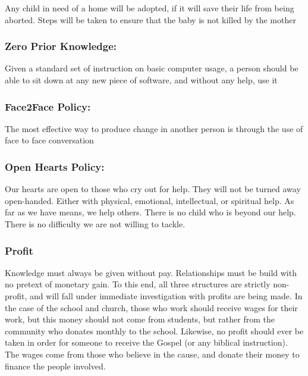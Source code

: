 \documentclass[CSHFoundation.tex]{subfiles}
\begin{document}
Any child in need of a home will be adopted, if it will save their life from being aborted. Steps will be taken to ensure that the baby is not killed by the mother



\subsubsection{Zero Prior Knowledge:}

Given a standard set of instruction on basic computer usage, a person should be able to sit down at any new piece of software, and without any help, use it



\subsubsection{Face2Face Policy:}

The most effective way to produce change in another person is through the use of face to face conversation



\subsubsection{Open Hearts Policy:}

Our hearts are open to those who cry out for help. They will not be turned away open-handed. Either with physical, emotional, intellectual, or spiritual help. As far as we have means, we help others. There is no child who is beyond our help. There is no difficulty we are not willing to tackle.


\subsubsection{Profit}
Knowledge must always be given without pay. Relationships must be build with no pretext of monetary gain. To this end, all three structures are strictly non-profit, and will fall under immediate investigation with profits are being made. In the case of the school and church, those who work should receive wages for their work, but this money should not come from students, but rather from the community who donates monthly to the school. Likewise, no profit should ever be taken in order for someone to receive the Gospel (or any biblical instruction). The wages come from those who believe in the cause, and donate their money to finance the people involved.
\end{document}
